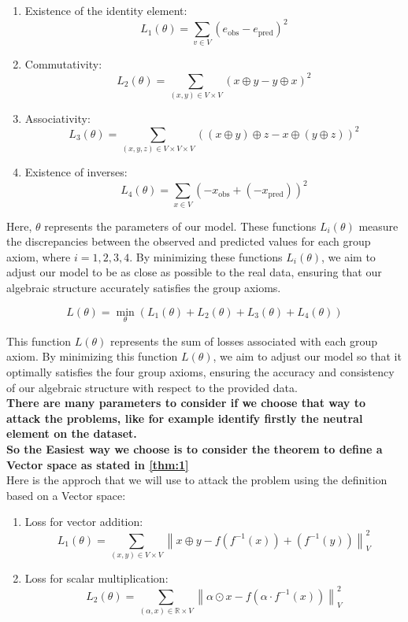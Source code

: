 \documentclass{report}
\begin{document}
    \begin{enumerate}
        \item Existence of the identity element:  \[
            L_1(\theta) = \sum_{v \in V} (e_{\text{obs}} - e_{\text{pred}})^2
            \]
        \item Commutativity:
        \[
        L_2(\theta) = \sum_{(x, y) \in V \times V} (x \oplus y - y \oplus x)^2
        \]
        \item Associativity:
        \[
        L_3(\theta) = \sum_{(x, y, z) \in V \times V \times V} ((x \oplus y) \oplus z - x \oplus (y \oplus z))^2
        \]
        \item Existence of inverses:
        \[
        L_4(\theta) = \sum_{x \in V} (-x_{\text{obs}} + (-x_{\text{pred}}))^2
        \] 
    \end{enumerate}
    
    Here, $\theta$ represents the parameters of our model.
    These functions $L_i(\theta)$ measure the discrepancies
    between the observed and predicted values for each group 
    axiom, where $i = 1, 2, 3, 4$. By minimizing these functions
    $L_i(\theta)$, we aim to adjust our model to be as close as
    possible to the real data, ensuring that our algebraic 
    structure accurately satisfies the group axioms. 

    $$
    L(\theta) = \min_{\theta} (L_1(\theta) + L_2(\theta) + L_3(\theta) + L_4(\theta))
    $$


    This function $L(\theta)$ represents the sum of losses 
    associated with each group axiom. By minimizing 
    this function $L(\theta)$, we aim to adjust our model so
    that it optimally satisfies the four group axioms, 
    ensuring the accuracy and consistency of our 
    algebraic structure with respect to the provided data.\\

    \textbf{There are many parameters to consider  if we choose that way to attack the problems, like for example identify firstly the neutral element on the dataset. \\
    So the Easiest way we choose is to consider the theorem to define a Vector space as stated in \ref{thm:1}}\\

    
    Here is the approch that we will use to attack the problem using the definition based on a Vector space:


    \begin{enumerate}
        \item Loss for vector addition:
        \[
            L_1(\theta) = \sum_{(x, y) \in V \times V} \left\lVert x \oplus y - f(f^{-1}(x)) + (f^{-1}(y)) \right\rVert_{V}^2
        \]
        \item Loss for scalar multiplication:
        \[
            L_2(\theta) = \sum_{(\alpha, x) \in \mathbb{R} \times V} \left\lVert \alpha \odot x - f(\alpha \cdot f^{-1}(x)) \right\rVert_{V}^2
        \]
    \end{enumerate}
\end{document}
